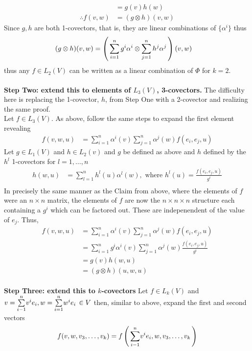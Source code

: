 \documentclass[10pt,a4paper]{report}
\begin{document}
\begin{enumerate}[label=3.\arabic*.]
{\begin{itemize}
\begin{align*}
		&= g(v)h(w) \\
		\therefore f(v,w) &= (g \otimes h)(v,w)
	\end{align*}Since $g,h$ are both 1-covectors, that is, they are linear combinations of $\{ \alpha^i \}$ thus 
	\begin{align*}
		(g \otimes h)(v,w) &= \left (\,  \sum_{i=1}^n g^i \alpha^i \otimes \sum_{j=1}^n h^j \alpha^j \,\right ) (v,w) 
	\end{align*}thus any $f \in L_2(V)$ can be written as a linear combination of $\Phi$ for $k=2$.\\ \\
	\textbf{Step Two: extend this to elements of $L_3(V)$, 3-covectors.}  The difficulty here is replacing the 1-covector, $h$, from Step One with a 2-covector and realizing the same proof.\\
	Let $f \in L_3(V)$.  As above, follow the same steps to expand the first element revealing
	\begin{align*}
		f(v, w, u) &= \sum_{i=1}^n \alpha^i(v) \sum_{j=1}^n \alpha^j(w)f(e_i, e_j, u)
	\end{align*}Let $g \in L_1(V)$ and $h \in L_2(v)$ and $g$ be defined as above and $h$ defined by the $h^l$ 1-covectors for $l = 1, \dots, n$
	\begin{align*}
		h(w, u) &= \sum_{l=1}^n h^l(u)\alpha^l(w), \text{ where } h^l(u) = \frac{f(e_i, e_j, u)}{g^i} \\
	\end{align*}In precisely the same manner as the Claim from above, where the elements of $f$ were an $n \times n$ matrix, the elements of $f$ are now the $n\times n \times n$ structure each containing a $g^i$ which can be factored out.  These are indepenendent of the value of $e_j$.  Thus,
	\begin{align*}
		f(v, w, u) &= \sum_{i=1}^n \alpha^i(v) \sum_{j=1}^n \alpha^j(w)f(e_i, e_j, u)\\
		&= \sum_{i=1}^n g^i \alpha^i(v) \sum_{j=1}^n \alpha^j(w) \frac{f(e_i, e_j, u)}{g^i} \\
		&= g(v)h(w,u) \\
		&= (g \otimes h)(u,w,u)
	\end{align*}
	\\
	\textbf{Step Three: extend this to $k$-covectors } 
		Let $f \in L_k(V)$ and $v=\underset{i-1}{\overset{n}{\sum}} v^ie_i, w=\underset{i=1}{\overset{n}{\sum}} w^ie_i \, \in V$ then, similar to above, expand the first and second vectors
	\begin{align*}
		f(v, w, v_3, \dots, v_k) &= f\PAREN{\SUM{i-1}{n} v^ie_i, w, v_3, \dots, v_k} \\

\end{align*}
\end{itemize}}
\end{enumerate}
\end{document}
